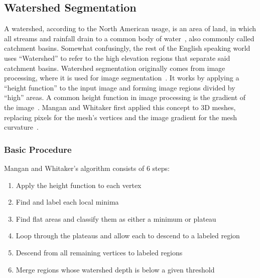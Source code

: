 \subsection{Watershed Segmentation}\label{sec:ws_seg}
A watershed, according to the North American usage, is an area of land, in which all streams and rainfall drain to a common body of water~\cite{USGS_Watersheds}, also commonly called catchment basins.
Somewhat confusingly, the rest of the English speaking world uses ``Watershed'' to refer to the high elevation regions that separate said catchment basins.
Watershed segmentation originally comes from image processing, where it is used for image segmentation~\cite{ImageSegWS, DigitalImageProc}.
It works by applying a ``height function'' to the input image and forming image regions divided by ``high'' areas.
A common height function in image processing is the gradient of the image~\cite{ImageSegWS}.
Mangan and Whitaker first applied this concept to 3D meshes, replacing pixels for the mesh's vertices and the image gradient for the mesh curvature~\cite{Watershed}.

\subsubsection{Basic Procedure}
Mangan and Whitaker's algorithm consists of 6 steps:
\begin{enumerate}
	\item Apply the height function to each vertex
	\item Find and label each local minima
	\item Find flat areas and classify them as either a minimum or plateau
	\item \label{plateau_step} Loop through the plateaus and allow each to descend to a labeled region
	\item Descend from all remaining vertices to labeled regions
	\item Merge regions whose watershed depth is below a given threshold
\end{enumerate}

